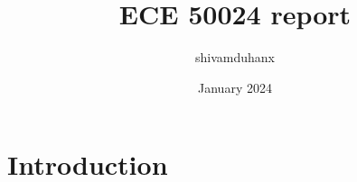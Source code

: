 \documentclass{article}
\title{ECE 50024 report}
\author{shivamduhanx }
\date{January 2024}
\begin{document}
\maketitle

\section{Introduction}
\end{document}
